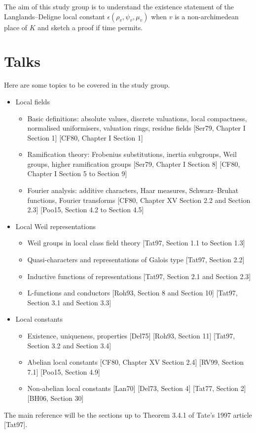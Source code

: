 The aim of this study group is to understand the existence statement of the Langlands--Deligne local constant $ \epsilon(\rho_v, \psi_v, \mu_v) $ when $ v $ is a non-archimedean place of $ K $ and sketch a proof if time permits.

\pagebreak

\section{Talks}

Here are some topics to be covered in the study group.
\begin{itemize}
\item Local fields
\begin{itemize}
\item Basic definitions: absolute values, discrete valuations, local compactness, normalised uniformisers, valuation rings, residue fields [Ser79, Chapter I Section 1] [CF80, Chapter I Section 1]
\item Ramification theory: Frobenius substitutions, inertia subgroups, Weil groups, higher ramification groups [Ser79, Chapter I Section 8] [CF80, Chapter I Section 5 to Section 9]
\item Fourier analysis: additive characters, Haar measures, Schwarz--Bruhat functions, Fourier transforms [CF80, Chapter XV Section 2.2 and Section 2.3] [Poo15, Section 4.2 to Section 4.5]
\end{itemize}
\item Local Weil representations
\begin{itemize}
\item Weil groups in local class field theory [Tat97, Section 1.1 to Section 1.3]
\item Quasi-characters and representations of Galois type [Tat97, Section 2.2]
\item Inductive functions of representations [Tat97, Section 2.1 and Section 2.3]
\item L-functions and conductors [Roh93, Section 8 and Section 10] [Tat97, Section 3.1 and Section 3.3]
\end{itemize}
\item Local constants
\begin{itemize}
\item Existence, uniqueness, properties [Del75] [Roh93, Section 11] [Tat97, Section 3.2 and Section 3.4]
\item Abelian local constants [CF80, Chapter XV Section 2.4] [RV99, Section 7.1] [Poo15, Section 4.9]
\item Non-abelian local constants [Lan70] [Del73, Section 4] [Tat77, Section 2] [BH06, Section 30]
\end{itemize}
\end{itemize}
The main reference will be the sections up to Theorem 3.4.1 of Tate's 1997 article [Tat97].

